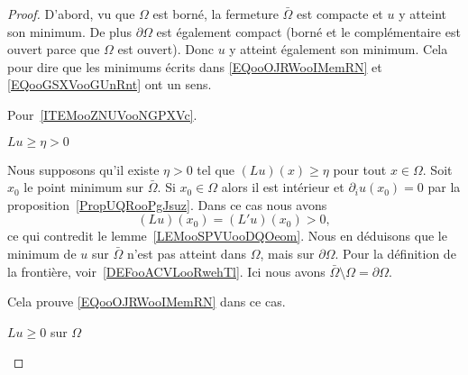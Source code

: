 \begin{proof}
	D'abord, vu que \( \Omega\) est borné, la fermeture \( \bar \Omega\) est compacte et \( u\) y atteint son minimum. De plus \( \partial \Omega\) est également compact (borné et le complémentaire est ouvert parce que \( \Omega\) est ouvert). Donc \( u\) y atteint également son minimum. Cela pour dire que les minimums écrits dans \eqref{EQooOJRWooIMemRN} et \eqref{EQooGSXVooGUnRnt} ont un sens.

	Pour~\ref{ITEMooZNUVooNGPXVc}.

	\begin{subproof}
		\item[\( Lu\geq \eta>0\)]

		Nous supposons qu'il existe \( \eta>0\) tel que \( (Lu)(x)\geq \eta \) pour tout \( x\in \Omega\). Soit \( x_0\) le point minimum sur \(\bar \Omega\). Si \( x_0\in \Omega\) alors il est intérieur et \( \partial_iu(x_0)=0\) par la proposition~\ref{PropUQRooPgJsuz}. Dans ce cas nous avons
		\begin{equation}
			(Lu)(x_0)=(L'u)(x_0)> 0,
		\end{equation}
		ce qui contredit le lemme~\ref{LEMooSPVUooDQOeom}. Nous en déduisons que le minimum de \( u\) sur \( \bar \Omega\) n'est pas atteint dans \( \Omega\), mais sur \( \partial\Omega\). Pour la définition de la frontière, voir~\ref{DEFooACVLooRwehTl}. Ici nous avons \( \bar\Omega\setminus\Omega=\partial\Omega\).

		Cela prouve \eqref{EQooOJRWooIMemRN} dans ce cas.

		\item[\( Lu\geq 0\) sur \( \Omega\)]


\end{subproof}
\end{proof}
